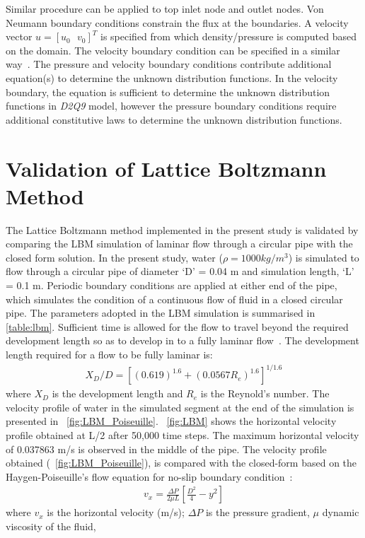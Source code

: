 Similar procedure can be applied to top inlet node and outlet nodes. Von Neumann boundary conditions constrain the flux at the boundaries. A velocity vector $u=\left[ u_0\mbox{ }v_0 \right]^T$ is specified from which density/pressure is computed based on the domain. The velocity boundary condition can be specified in a similar way~\citep{Zou1997}. The pressure and velocity boundary conditions contribute additional equation(s) to determine the unknown distribution functions. In the velocity boundary, the equation is sufficient to determine the unknown distribution functions in \textit{D2Q9} model, however the pressure boundary conditions require additional constitutive laws to determine the unknown distribution functions. 

\section{Validation of Lattice Boltzmann Method}
The Lattice Boltzmann method implemented in the present study is validated by comparing the LBM simulation of laminar flow  through a circular pipe with the closed form solution. In the present study, water ($\rho=1000 kg/m^{3}$) is simulated to flow through a circular pipe of diameter `D' = 0.04 m and simulation length, `L' = 0.1 m. Periodic boundary conditions are applied at either end of the pipe, which simulates the condition of a continuous flow of fluid in a closed circular pipe. The parameters adopted in the LBM simulation is summarised in \cref{table:lbm}. Sufficient time is allowed for the flow to travel beyond the required development length so as to develop in to a fully laminar flow~\citet{Durst2005}. The development length required for a flow to be fully laminar is:
\begin{eqnarray}
X_{D}/D=[(0.619)^{1.6}+(0.0567 R_{e})^{1.6}]^{1/1.6}
\end{eqnarray}
where $X_{D}$ is the development length and $R_{e}$ is the Reynold's number. The velocity profile of water in the simulated segment at the end of the simulation is presented in ~\cref{fig:LBM_Poiseuille}. ~\cref{fig:LBM} shows the horizontal velocity profile obtained at L/2 after 50,000 time steps. The maximum horizontal velocity of 0.037863 m/s is observed in the middle of the pipe. The velocity profile obtained (~\cref{fig:LBM_Poiseuille}), is compared with the closed-form based on the Haygen-Poiseuille's flow equation for no-slip boundary condition~\citep{Willis2008}:
\begin{eqnarray}
\mathit{v}_{\mathit{x}}=\frac{\Delta P}{2 \mu L} [\frac{D^{2}}{4}-y^{2}]
\end{eqnarray}
where $v_{x}$ is the horizontal velocity (m/s); $\Delta P$ is the pressure gradient, $\mu$ dynamic viscosity of the fluid, 

